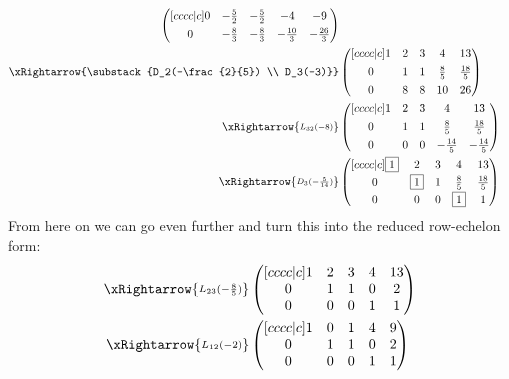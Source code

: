 \begin{exm}
\begin{align*}
\begin{pmatrix}[cccc|c]
			0 & -\frac{5}{2} & -\frac{5}{2} & -4            & -9            \\[4pt]
			0 & -\frac{8}{3} & -\frac{8}{3} & -\frac{10}{3} & -\frac{26}{3}
		\end{pmatrix}            \\
		\xRightarrow{\substack{D_2(-\frac{2}{5}) \\ D_3(-3)}}
		 & \begin{pmatrix}[cccc|c]
			1 & 2 & 3 & 4           & 13           \\[4pt]
			0 & 1 & 1 & \frac{8}{5} & \frac{18}{5} \\[4pt]
			0 & 8 & 8 & 10          & 26
		\end{pmatrix}            \\
		\xRightarrow{\substack{L_{32}(-8)}}
		 & \begin{pmatrix}[cccc|c]
			1 & 2 & 3 & 4             & 13            \\[4pt]
			0 & 1 & 1 & \frac{8}{5}   & \frac{18}{5}  \\[4pt]
			0 & 0 & 0 & -\frac{14}{5} & -\frac{14}{5}
		\end{pmatrix}            \\
		\xRightarrow{\substack{D_{3}(-\frac{5}{14})}}
		 & \begin{pmatrix}[cccc|c]
			\boxed{1} & 2         & 3 & 4           & 13           \\[2pt]
			0         & \boxed{1} & 1 & \frac{8}{5} & \frac{18}{5} \\[2pt]
			0         & 0         & 0 & \boxed{1}   & 1
		\end{pmatrix}
	\end{align*}
	From here on we can go even further and turn this into the reduced row-echelon
	form:
	\begin{align*}
		\xRightarrow{\substack{L_{23}(-\frac{8}{5})}}
		 & \begin{pmatrix}[cccc|c]
			1 & 2 & 3 & 4 & 13 \\
			0 & 1 & 1 & 0 & 2  \\
			0 & 0 & 0 & 1 & 1  \\
		\end{pmatrix} \\
		\xRightarrow{\substack{L_{12}(-2)}}
		 & \begin{pmatrix}[cccc|c]
			1 & 0 & 1 & 4 & 9 \\
			0 & 1 & 1 & 0 & 2 \\
			0 & 0 & 0 & 1 & 1 \\
		\end{pmatrix} \\

\end{align*}
\end{exm}
